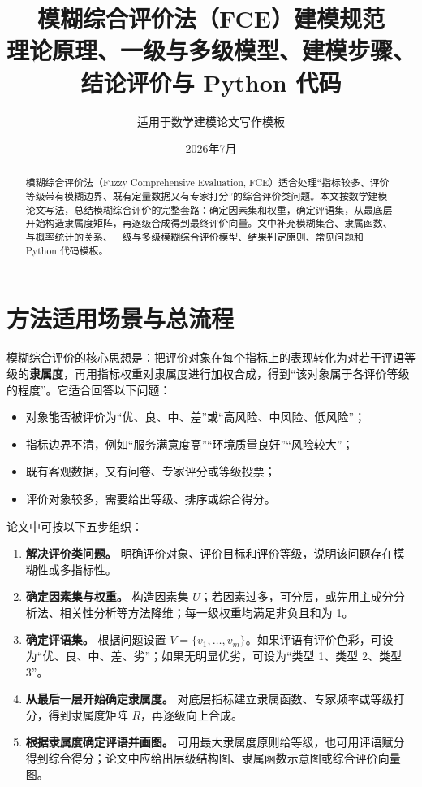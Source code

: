 \documentclass[UTF8,zihao=-4,fontset=none]{ctexart}
\title{模糊综合评价法（FCE）建模规范\\\large 理论原理、一级与多级模型、建模步骤、结论评价与 Python 代码}
\author{适用于数学建模论文写作模板}
\date{2026年7月}
\begin{document}
\maketitle
\begin{abstract}
模糊综合评价法（Fuzzy Comprehensive Evaluation, FCE）适合处理“指标较多、评价等级带有模糊边界、既有定量数据又有专家打分”的综合评价类问题。本文按数学建模论文写法，总结模糊综合评价的完整套路：确定因素集和权重，确定评语集，从最底层开始构造隶属度矩阵，再逐级合成得到最终评价向量。文中补充模糊集合、隶属函数、与概率统计的关系、一级与多级模糊综合评价模型、结果判定原则、常见问题和 Python 代码模板。
\end{abstract}

\tableofcontents
\newpage

\section{方法适用场景与总流程}
模糊综合评价的核心思想是：把评价对象在每个指标上的表现转化为对若干评语等级的\textbf{隶属度}，再用指标权重对隶属度进行加权合成，得到“该对象属于各评价等级的程度”。它适合回答以下问题：
\begin{itemize}[leftmargin=2.2em]
  \item 对象能否被评价为“优、良、中、差”或“高风险、中风险、低风险”；
  \item 指标边界不清，例如“服务满意度高”“环境质量良好”“风险较大”；
  \item 既有客观数据，又有问卷、专家评分或等级投票；
  \item 评价对象较多，需要给出等级、排序或综合得分。
\end{itemize}

论文中可按以下五步组织：
\begin{enumerate}[label=Step\arabic*：,leftmargin=3.2em]
  \item \textbf{解决评价类问题。} 明确评价对象、评价目标和评价等级，说明该问题存在模糊性或多指标性。
  \item \textbf{确定因素集与权重。} 构造因素集 $U$；若因素过多，可分层，或先用主成分分析法、相关性分析等方法降维；每一级权重均满足非负且和为 1。
  \item \textbf{确定评语集。} 根据问题设置 $V=\{v_1,\ldots,v_m\}$。如果评语有评价色彩，可设为“优、良、中、差、劣”；如果无明显优劣，可设为“类型 1、类型 2、类型 3”。
  \item \textbf{从最后一层开始确定隶属度。} 对底层指标建立隶属函数、专家频率或等级打分，得到隶属度矩阵 $R$，再逐级向上合成。
  \item \textbf{根据隶属度确定评语并画图。} 可用最大隶属度原则给等级，也可用评语赋分得到综合得分；论文中应给出层级结构图、隶属函数示意图或综合评价向量图。
\end{enumerate}
\end{document}
